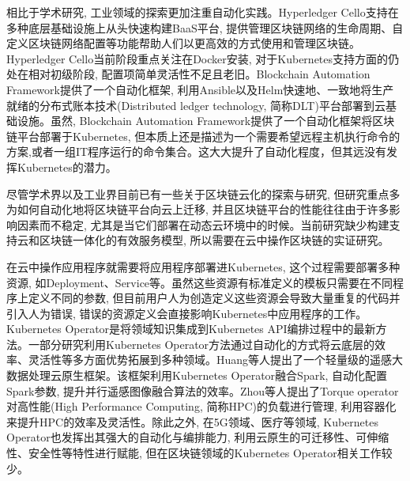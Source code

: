 相比于学术研究, 工业领域的探索更加注重自动化实践。Hyperledger Cello\footnotemark[1]支持在多种底层基础设施上从头快速构建BaaS平台, 提供管理区块链网络的生命周期、自定义区块链网络配置等功能帮助人们以更高效的方式使用和管理区块链。Hyperledger Cello当前阶段重点关注在Docker安装, 对于Kubernetes支持方面的仍处在相对初级阶段, 配置项简单灵活性不足且老旧。Blockchain Automation Framework\footnotemark[2]提供了一个自动化框架, 利用Ansible\footnotemark[3]以及Helm\footnotemark[4]快速地、一致地将生产就绪的分布式账本技术(Distributed ledger technology, 简称DLT)平台部署到云基础设施。虽然, Blockchain Automation Framework提供了一个自动化框架将区块链平台部署于Kubernetes, 但本质上还是描述为一个需要希望远程主机执行命令的方案,或者一组IT程序运行的命令集合。这大大提升了自动化程度，但其远没有发挥Kubernetes的潜力。

尽管学术界以及工业界目前已有一些关于区块链云化的探索与研究, 但研究重点多为如何自动化地将区块链平台向云上迁移, 并且区块链平台的性能往往由于许多影响因素而不稳定, 尤其是当它们部署在动态云环境中的时候。当前研究缺少构建支持云和区块链一体化的有效服务模型\cite{9582270}, 所以需要在云中操作区块链的实证研究\cite{8790849}。

在云中操作应用程序就需要将应用程序部署进Kubernetes, 这个过程需要部署多种资源, 如Deployment、Service等。虽然这些资源有标准定义的模板只需要在不同程序上定义不同的参数, 但目前用户人为创造定义这些资源会导致大量重复的代码并引入人为错误, 错误的资源定义会直接影响Kubernetes中应用程序的工作。Kubernetes Operator是将领域知识集成到Kubernetes API编排过程中的最新方法\cite{henning2021reproducible}。一部分研究利用Kubernetes Operator方法通过自动化的方式将云底层的效率、灵活性等多方面优势拓展到多种领域。Huang等人\cite{huang2021fly}提出了一个轻量级的遥感大数据处理云原生框架。该框架利用Kubernetes Operator融合Spark, 自动化配置Spark参数, 提升并行遥感图像融合算法的效率。Zhou等人\cite{zhou2021container}提出了Torque operator对高性能(High Performance Computing, 简称HPC)的负载进行管理, 利用容器化来提升HPC的效率及灵活性。除此之外, 在5G领域\cite{arouk20205g}\cite{wiranata2020automation}、医疗\cite{rouzbeh2020unified}等领域, Kubernetes Operator也发挥出其强大的自动化与编排能力, 利用云原生的可迁移性、可伸缩性、安全性等特性进行赋能, 但在区块链领域的Kubernetes Operator相关工作较少。


